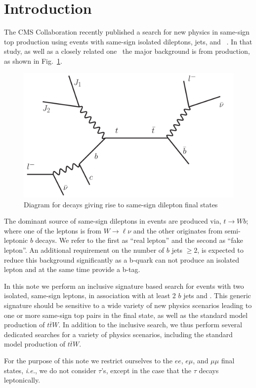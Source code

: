 \section{Introduction}
\label{sec:intro}
The CMS Collaboration recently published a search for new physics
in same-sign top production using events with same-sign isolated dileptons, jets, and \met~\cite{sstop}. 
In that study, as well as a closely related one~\cite{sspaper} the major
background is from \ttbar production, as shown in Fig.~\ref{fig:ttbar}.

\begin{figure}[htb]
\begin{center}
\includegraphics[width=0.6\linewidth, height=0.35\linewidth]{figs/ttbar.pdf}
\caption{ Diagram for \ttbar decays giving rise to same-sign dilepton final states \label{fig:ttbar}}
\end{center}
\end{figure}

The dominant source of same-sign dileptons in \ttbar events are produced via, $t \rightarrow W b$; where 
one of the leptons is from $W \rightarrow \ell \nu $ and the other originates from semi-leptonic $b$ decays. 
We refer to the first as ``real lepton'' and the second as ``fake lepton''.
An additional requirement on the number of $b$ jets $\geq 2$, is expected to reduce this background significantly
as a b-quark can not produce an isolated lepton and at the same time provide a b-tag.

In this note we perform an inclusive signature based search for events with two isolated, same-sign leptons,
in association with at least 2 $b$ jets and \met. This generic signature should be sensitive to 
a wide variety of new physics scenarios leading to one or more same-sign top pairs in the final state, as well as the standard model
production of $t\bar{t}W$. In addition to the inclusive search, we thus perform several dedicated searches for a variety
of physics scenarios, including the standard model production of $t\bar{t}W$.
 
For the purpose of this note we restrict ourselves to the $ee$, $e\mu$, and $\mu\mu$ 
final states, {\em i.e.}, we do not consider $\tau$'s, except in the case that the $\tau$ decays leptonically.

